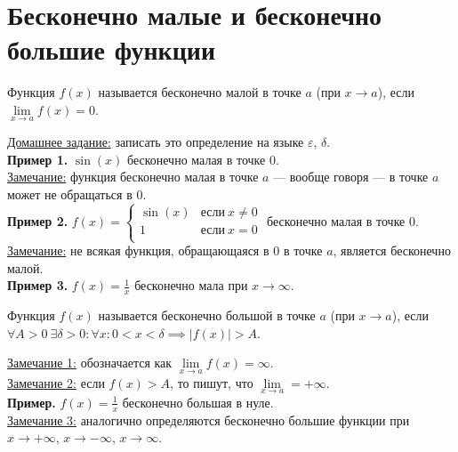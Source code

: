 \documentclass{article}
\begin{document}
    \section{Бесконечно малые и бесконечно большие функции}
    \begin{definition}
        Функция \(f(x)\) называется бесконечно малой в точке \(a\) (при \(x \to a\)), если \(\lim\limits_{x \to a}f(x) = 0\).
    \end{definition}
    \noindent
    \underline{Домашнее задание:} записать это определение на языке \(\varepsilon\), \(\delta\).\\[0.1cm]
    \textbf{Пример 1.} \(\displaystyle \sin(x)\) бесконечно малая в точке \(0\).\\
    \underline{Замечание:} функция бесконечно малая в точке \(a\) --- вообще говоря --- в точке \(a\) может не обращаться в 0.\\
    \textbf{Пример 2.} \(\displaystyle f(x) =
    \begin{cases}
        \sin(x) & \text{если}\ x \neq 0\\
        1 & \text{если}\ x = 0\\ 
    \end{cases}\) бесконечно малая в точке 0.\\
    \underline{Замечание:} не всякая функция, обращающаяся в 0 в точке \(a\), является бесконечно малой.\\
    \textbf{Пример 3.} \(\displaystyle f(x) = \frac{1}{x}\) бесконечно мала при \(x \to \infty\).
    \begin{definition}
        Функция \(f(x)\) называется бесконечно большой в точке \(a\) (при \(x \to a\)), если \(\forall A > 0\ \exists \delta > 0: \forall x: 0 < x < \delta \implies |f(x)| > A\).  
    \end{definition}
    \noindent
    \underline{Замечание 1:} обозначается как \(\lim\limits_{x \to a}f(x) = \infty\).\\
    \underline{Замечание 2:} если \(f(x) > A\), то пишут, что \(\lim\limits_{x \to a} = +\infty\).\\
    \textbf{Пример.} \(\displaystyle f(x) = \frac{1}{x}\) бесконечно большая в нуле.\\
    \underline{Замечание 3:} аналогично определяются бесконечно большие функции при \(x \to +\infty\), \(x \to -\infty\), \(x \to \infty\).   
\end{document}
